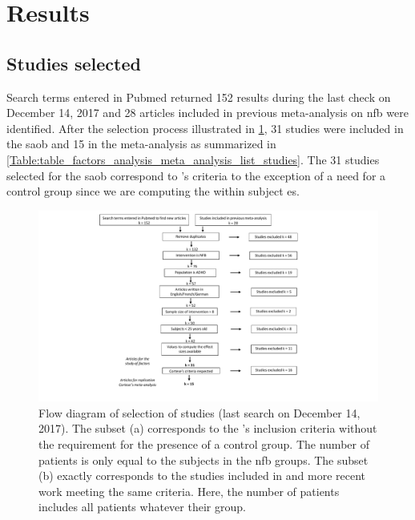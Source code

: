 


\section{Results}

\subsection{Studies selected}

Search terms entered in Pubmed returned 152 results during the last check on December 14, 2017 and 28 articles included in previous
meta-analysis on \gls{nfb} were identified. After the selection process illustrated in \cref{Figure:systematic_review_workflow}, 
31 studies were included in the \gls{saob} and 15 in the meta-analysis as summarized in \cref{Table:table_factors_analysis_meta_analysis_list_studies}.
The 31 studies selected for the \gls{saob} correspond to \citeauthor{Cortese2016}'s criteria to the exception of a need for a control group since 
we are computing the within subject \gls{es}.  

\begin{figure}[h!]
  \centering
	\includegraphics[width=1\textwidth]{figures/meta_review_factors_analysis_how_studies_are_included_no_colors_2-columns_fitting_ima} 
  \caption{Flow diagram of selection of studies (last search on December 14, 2017).  
	The subset (a) corresponds to the \citeauthor{Cortese2016}'s inclusion criteria without the requirement for the presence of a control group. The number
	of patients is only equal to the subjects in the \gls{nfb} groups.
	The subset (b) exactly corresponds to the studies included in \citet{Cortese2016} and more recent work meeting the same criteria. Here, the number of patients includes all patients
	whatever their group.}
  \label{Figure:systematic_review_workflow}
\end{figure}

